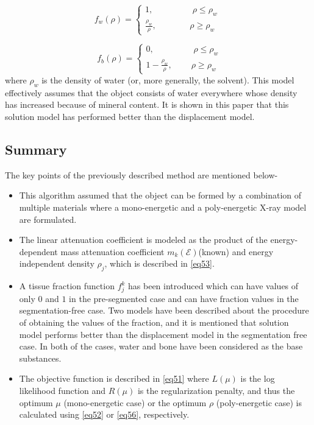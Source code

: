 \[
    f_w(\rho)= 
\begin{cases}
    1, \; \; \;  \; \; \; \; \; \; \; \; \; \; \;  \; \; \,   \rho \leqslant \rho_w\    \\     \frac{\rho_w}{\rho}, \; \; \; \; \; \; \; \; \; \; \; \; \; \;   \rho \geq \rho_w
\end{cases}
\]


\[
    \; \, f_b(\rho)= 
\begin{cases}
    0, \; \; \;  \; \; \; \; \; \; \; \; \; \; \;  \; \; \,  \rho \leqslant \rho_w\    \\     1 - \frac{\rho_w}{\rho}, \; \; \; \; \; \; \; \;   \rho \geq \rho_w
\end{cases}
\] where $\rho_w$ is the density of water (or, more generally, the solvent). This model effectively assumes that the object consists of water everywhere whose density has increased because of mineral content. It is shown in this paper that this solution model has performed better than the displacement model.


\subsection{Summary}

The key points of the previously described method are mentioned below-

\begin{itemize}

  \item This algorithm assumed that the object can be formed by a combination of multiple materials where a mono-energetic and a poly-energetic X-ray model are formulated.
  
  \item The linear attenuation coefficient is modeled as the product of the energy-dependent mass attenuation coefficient $m_k(\mathcal{E})$(known) and energy independent density $\rho_j$, which is described in \ref{eq53}.
  
  \item A tissue fraction function $f_{j}^{k}$ has been introduced which can have values of only $0$ and $1$ in the pre-segmented case and can have fraction values in the segmentation-free case. Two models have been described about the procedure of obtaining the values of the fraction, and it is mentioned that solution model performs better than the displacement model in the segmentation free case. In both of the cases, water and bone have been considered as the base substances.
  
  \item The objective function is described in \ref{eq51} where $L(\mu)$ is the log likelihood function and $R(\mu)$ is the regularization penalty, and thus the optimum $\mu$ (mono-energetic case) or the optimum $\rho$ (poly-energetic case) is calculated using \ref{eq52} or \ref{eq56}, respectively.
   
\end{itemize}
